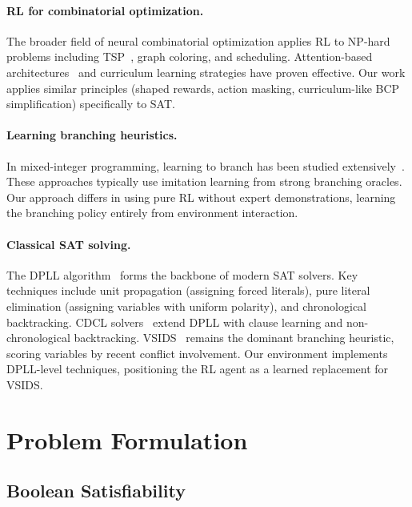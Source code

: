 \documentclass{article}
\begin{document}
\paragraph{RL for combinatorial optimization.}
The broader field of neural combinatorial optimization applies RL to NP-hard problems including TSP~\cite{bello2016neural}, graph coloring, and scheduling. Attention-based architectures~\cite{kool2019attention} and curriculum learning strategies have proven effective. Our work applies similar principles (shaped rewards, action masking, curriculum-like BCP simplification) specifically to SAT.

\paragraph{Learning branching heuristics.}
In mixed-integer programming, learning to branch has been studied extensively~\cite{khalil2016learning, gasse2019exact}. These approaches typically use imitation learning from strong branching oracles. Our approach differs in using pure RL without expert demonstrations, learning the branching policy entirely from environment interaction.

\paragraph{Classical SAT solving.}
The DPLL algorithm~\cite{davis1962machine} forms the backbone of modern SAT solvers. Key techniques include unit propagation (assigning forced literals), pure literal elimination (assigning variables with uniform polarity), and chronological backtracking. CDCL solvers~\cite{silva1997grasp} extend DPLL with clause learning and non-chronological backtracking. VSIDS~\cite{moskewicz2001chaff} remains the dominant branching heuristic, scoring variables by recent conflict involvement. Our environment implements DPLL-level techniques, positioning the RL agent as a learned replacement for VSIDS.

\section{Problem Formulation}

\subsection{Boolean Satisfiability}
\end{document}
